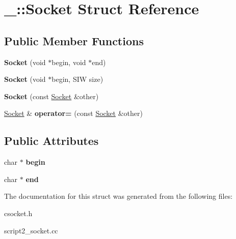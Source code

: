 \hypertarget{struct___1_1_socket}{}\section{\+\_\+\+:\+:Socket Struct Reference}
\label{struct___1_1_socket}
\subsection*{Public Member Functions}
\begin{DoxyCompactItemize}
\item 
\mbox{\label{struct___1_1_socket_a923b7fab144b6904243e6d810e0bd8bb}} 
{\bfseries Socket} (void $\ast$begin, void $\ast$end)
\item 
\mbox{\label{struct___1_1_socket_a6097aeb259bfc581f43b751f86831550}} 
{\bfseries Socket} (void $\ast$begin, S\+IW size)
\item 
\mbox{\label{struct___1_1_socket_a6b2080b00a83d7046dbde89725035100}} 
{\bfseries Socket} (const \mbox{\hyperlink{struct___1_1_socket}{Socket}} \&other)
\item 
\mbox{\label{struct___1_1_socket_a03847729267b665839b62697d048fe92}} 
\mbox{\hyperlink{struct___1_1_socket}{Socket}} \& {\bfseries operator=} (const \mbox{\hyperlink{struct___1_1_socket}{Socket}} \&other)
\end{DoxyCompactItemize}
\subsection*{Public Attributes}
\begin{DoxyCompactItemize}
\item 
\mbox{\label{struct___1_1_socket_a56b74fec8beff4f276c3ce242756ecb9}} 
char $\ast$ {\bfseries begin}
\item 
\mbox{\label{struct___1_1_socket_ab2a4f34d0657744f04de538fed2b7369}} 
char $\ast$ {\bfseries end}
\end{DoxyCompactItemize}


The documentation for this struct was generated from the following files\+:\begin{DoxyCompactItemize}
\item 
csocket.\+h\item 
script2\+\_\+socket.\+cc\end{DoxyCompactItemize}
